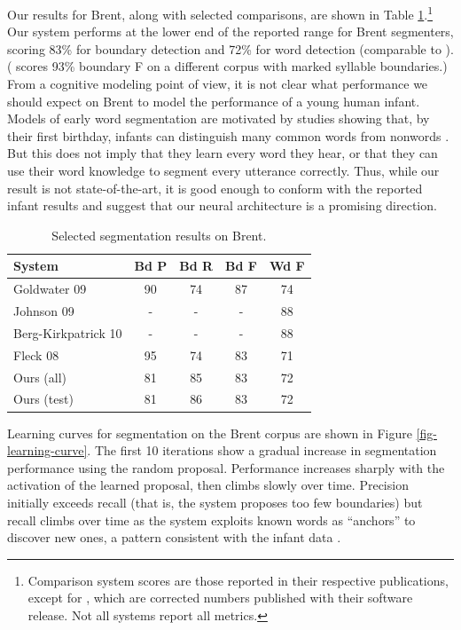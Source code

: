 \documentclass[11pt,letterpaper]{article}
\begin{document}
Our results for Brent, along with selected comparisons, are shown in
Table \ref{tab-results}.\footnote{Comparison system scores are those
  reported in their respective publications, except for
  , which are corrected numbers published with
  their software release. Not all systems report all metrics.} Our
system performs at the lower end of the reported range for Brent
segmenters, scoring 83\% for boundary detection and 72\% for word
detection (comparable to \cite{Fleck08}). ( scores
93\% boundary F on a different corpus with marked syllable
boundaries.) From a cognitive modeling point of view, it is not clear
what performance we should expect on Brent to model the performance of
a young human infant. Models of early word segmentation are motivated
by studies showing that, by their first birthday, infants can
distinguish many common words from nonwords
\cite{Vihman04,Swingley05}. But this does not imply that they learn
every word they hear, or that they can use their word knowledge to
segment every utterance correctly. Thus, while our result is not
state-of-the-art, it is good enough to conform with the reported
infant results and suggest that our neural architecture is a promising
direction.


\begin{table}
\begin{tabular}{p{2.1cm}cccc}
System & Bd P & Bd R & Bd F & Wd F\\
\hline
Goldwater 09       & 90 & 74 & 87 & 74\\ 
Johnson 09         & - & - & - & 88\\
Berg-Kirkpatrick 10 & - & - & - & 88\\
Fleck 08           & 95 & 74 & 83 & 71\\
\hline
Ours (all) & 81 & 85 & 83 & 72\\
Ours (test) & 81 & 86 & 83 & 72\\
\end{tabular}
\caption{Selected segmentation results on Brent.}
\label{tab-results}
\end{table}

Learning curves for segmentation on the Brent corpus are shown in
Figure \ref{fig-learning-curve}. The first 10 iterations show a
gradual increase in segmentation performance using the random
proposal. Performance increases sharply with the activation of
the learned proposal, then climbs slowly over time. Precision
initially exceeds recall (that is, the system proposes too few
boundaries) but recall climbs over time as the system exploits known
words as ``anchors'' to discover new ones, a pattern consistent with
the infant data \cite{Bortfeld05}.
\end{document}
